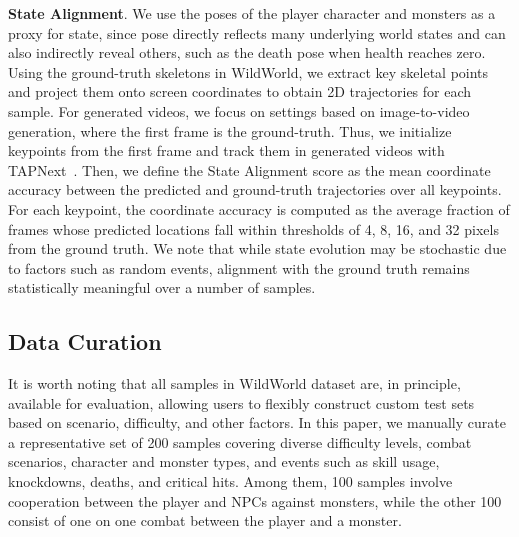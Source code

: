 \noindent
\textbf{State Alignment}.
We use the poses of the player character and monsters as a proxy for state, since pose directly reflects many underlying world states and can also indirectly reveal others, such as the death pose when health reaches zero.
Using the ground-truth skeletons in WildWorld, we extract key skeletal points and project them onto screen coordinates to obtain 2D trajectories for each sample.
For generated videos, we focus on settings based on image-to-video generation, where the first frame is the ground-truth.
Thus, we initialize keypoints from the first frame and track them in generated videos with TAPNext~\cite{zholus2025tapnext}. 
Then, we define the State Alignment score as the mean coordinate accuracy between the predicted and ground-truth trajectories over all keypoints.
For each keypoint, the coordinate accuracy is computed as the average fraction of frames whose predicted locations fall within thresholds of 4, 8, 16, and 32 pixels from the ground truth.
We note that while state evolution may be stochastic due to factors such as random events, alignment with the ground truth remains statistically meaningful over a number of samples.

\subsection{Data Curation}

It is worth noting that all samples in WildWorld dataset are, in principle, available for evaluation, allowing users to flexibly construct custom test sets based on scenario, difficulty, and other factors.
In this paper, we manually curate a representative set of 200 samples covering diverse difficulty levels, combat scenarios, character and monster types, and events such as skill usage, knockdowns, deaths, and critical hits.
Among them, 100 samples involve cooperation between the player and NPCs against monsters, while the other 100 consist of one on one combat between the player and a monster.
